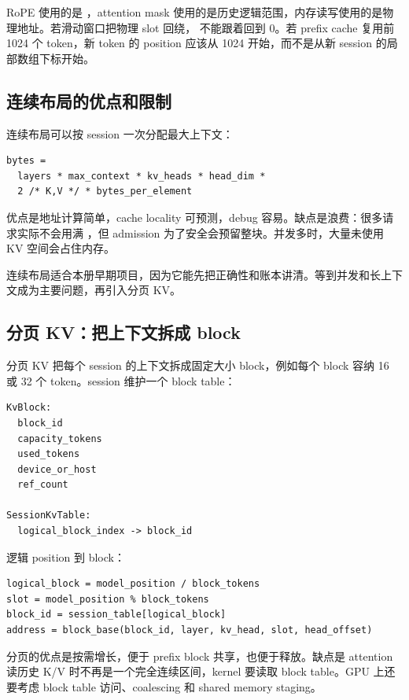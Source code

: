 RoPE 使用的是 ，attention mask 使用的是历史逻辑范围，内存读写使用的是物理地址。若滑动窗口把物理 slot 回绕， 不能跟着回到 0。若 prefix cache 复用前 1024 个 token，新 token 的 position 应该从 1024 开始，而不是从新 session 的局部数组下标开始。

\subsection{连续布局的优点和限制}

连续布局可以按 session 一次分配最大上下文：

\begin{lstlisting}[numbers=none,caption={连续 KV 分配}]
bytes =
  layers * max_context * kv_heads * head_dim *
  2 /* K,V */ * bytes_per_element
\end{lstlisting}

优点是地址计算简单，cache locality 可预测，debug 容易。缺点是浪费：很多请求实际不会用满 ，但 admission 为了安全会预留整块。并发多时，大量未使用 KV 空间会占住内存。

连续布局适合本册早期项目，因为它能先把正确性和账本讲清。等到并发和长上下文成为主要问题，再引入分页 KV。

\subsection{分页 KV：把上下文拆成 block}

分页 KV 把每个 session 的上下文拆成固定大小 block，例如每个 block 容纳 16 或 32 个 token。session 维护一个 block table：

\begin{lstlisting}[numbers=none,caption={分页 KV 元数据}]
KvBlock:
  block_id
  capacity_tokens
  used_tokens
  device_or_host
  ref_count

SessionKvTable:
  logical_block_index -> block_id
\end{lstlisting}

逻辑 position 到 block：

\begin{lstlisting}[numbers=none,caption={分页 KV 地址计算}]
logical_block = model_position / block_tokens
slot = model_position % block_tokens
block_id = session_table[logical_block]
address = block_base(block_id, layer, kv_head, slot, head_offset)
\end{lstlisting}

分页的优点是按需增长，便于 prefix block 共享，也便于释放。缺点是 attention 读历史 K/V 时不再是一个完全连续区间，kernel 要读取 block table。GPU 上还要考虑 block table 访问、coalescing 和 shared memory staging。

